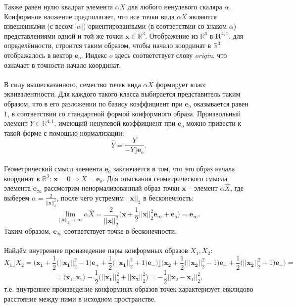 \documentclass[12pt]{article}
\begin{document}
\noindent
    Также равен нулю квадрат элемента $\alpha X$ для любого ненулевого скаляра $\alpha$. Конформное вложение предполагает, что все точки вида $\alpha X$ являются взвешенными (с весом $|\alpha|$) ориентированными (в соответствии со знаком $\alpha$) представлениями одной и той же точки $\mathbf{x} \in \mathds{R}^3$. Отображение из $\mathds{R}^3$ в $\mathbf{R}^{4,1}$, для определённости, строится таким образом, чтобы начало координат в $\mathds{R}^3$ отображалось в вектор $\mathbf{e}_o$. Индекс $o$ здесь соответствует слову \textit{origin}, что означает в точности начало координат.
    \paragraph{}
    В силу вышесказанного, семество точек вида $\alpha X$ формирует класс эквивалентности. Для каждого такого класса выбирается представитель таким образом, что в его разложении по базису коэффициент при $\mathbf{e}_o$ оказывается равен $1$, в соответствии со стандартной формой конформного образа. Произвольный элемент $Y \in \mathds{R}^{4,1}$, имеющий ненулевой коэффициент при $\mathbf{e}_o$ можно привести к такой форме с помощью нормализации:
    $$ \hat{Y} = \frac{Y}{- Y \rfloor \mathbf{e}_o}.$$
    
    \paragraph{}
    Геометрический смысл элемента $\mathbf{e}_o$ заключается в том, что это образ начала координат в $\mathds{R}^3$:
    $\mathbf{x} = 0 \Rightarrow X = \mathbf{e}_o$. Для отыскания геометрического смысла элемента $\mathbf{e}_{\infty}$ рассмотрим ненормализованный образ точки $\mathbf{x}$ -- элемент $\alpha \hat{X}$, где выберем $\alpha = \frac{2}{||\mathbf{x}||_2^2}$, после чего устремим $||\mathbf{x}||_2$ в бесконечность:
    $$ \lim_{||\mathbf{x}||_2 \rightarrow \infty} \alpha \hat{X}  = \frac{2}{||\mathbf{x}||_2^2}\Big(\mathbf{x} + \frac{1}{2}||\mathbf{x}||_2^2 \mathbf{e}_{\infty} + \mathbf{e}_o \Big) = \mathbf{e}_{\infty}.$$
    \noindent
    Таким образом, $\mathbf{e}_{\infty}$ соответствует точке в бесконечности.    
    
    \paragraph{}
    Найдём внутреннее произведение пары конформных образов $X_1, X_2$:
    $$ X_1 \rfloor X_2 = \Big(\mathbf{x_1} + \frac{1}{2}\big(||\mathbf{x_1}||_2^2 - 1\big)\mathbf{e}_+ + \frac{1}{2}\big(||\mathbf{x_1}||_2^2 + 1\big)\mathbf{e}_-\Big) \rfloor \Big(\mathbf{x_2} + \frac{1}{2}\big(||\mathbf{x_2}||_2^2 - 1\big)\mathbf{e}_+ + \frac{1}{2}\big(||\mathbf{x_2}||_2^2 + 1\big)\mathbf{e}_-\Big) = $$
    $$ = \big\langle\mathbf{x}_1, \mathbf{x}_2 \big\rangle - \frac{1}{2}\big(||\mathbf{x_1}||_2^2 + ||\mathbf{x_2}||_2^2 \big) = -\frac{1}{2}||\mathbf{x}_2 - \mathbf{x}_1||_2^2,$$
    \noindent
    т.е. внутреннее произведение конформных образов точек характеризует евклидово расстояние между ними в исходном пространстве.
    
\end{document}
